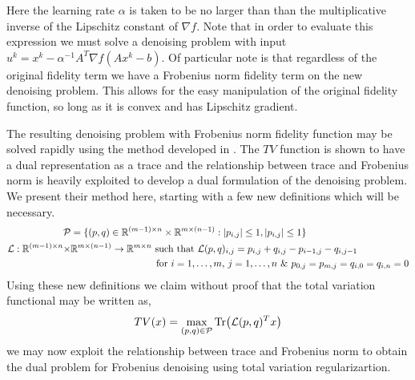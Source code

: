 \documentclass[10pt,a4paper]{article}
\newcommand{\R}{\mathbb{R}}
\begin{document}
Here the learning rate $\alpha$ is taken to be no larger than than the multiplicative inverse of the Lipschitz constant of $\nabla f$.  Note that in order to evaluate this expression we must solve a denoising problem with input $u^k = x^k - \alpha^{-1} A^T\nabla f (Ax^k - b)$.  Of particular note is that regardless of the original fidelity term we have a Frobenius norm fidelity term on the new denoising problem.  This allows for the easy manipulation of the original fidelity function, so long as it is convex and has Lipschitz gradient.

The resulting denoising problem with Frobenius norm fidelity function may be solved rapidly using the method developed in \cite{TV}.  The $TV$ function is shown to have a dual representation as a trace and the relationship between trace and Frobenius norm is heavily exploited to develop a dual formulation of the denoising problem.  We present their method here, starting with a few new definitions which will be necessary.
\begin{align*}
\mathcal{P} &= \{ (p,q) \in \R^{(m-1) \times n} \times \R^{ m \times (n-1) } :  \abs{p_{i,j} } \le 1, \abs{p_{ i,j } } \le 1 \} \\
 \mathcal{L} : \R^{(m-1) \times n} \times& \R^{ m \times (n-1) } \rightarrow \R^{m \times n}  \text{ such that } \mathcal{L}(p,q)_{i,j} = p_{i,j} + q_{i,j} - p_{ i-1,j } - q_{ i,j-1 }\\ &\hspace{3 cm} \text{ for } i = 1,\dots,m,\,j = 1,\dots,n \text{ \& }  p_{0,j} = p_{m,j} = q_{i,0} = q_{i,n} = 0\\
\end{align*}
Using these new definitions we claim without proof that the total variation functional may be written as,
\begin{equation}
TV(x) = \underset{(p,q) \in \mathcal{P}}{\max} \Tr(\mathcal{L}(p,q)^Tx)
\end{equation}
we may now exploit the relationship between trace and Frobenius norm to obtain the dual problem for Frobenius denoising using total variation regularizartion.  
\end{document}

